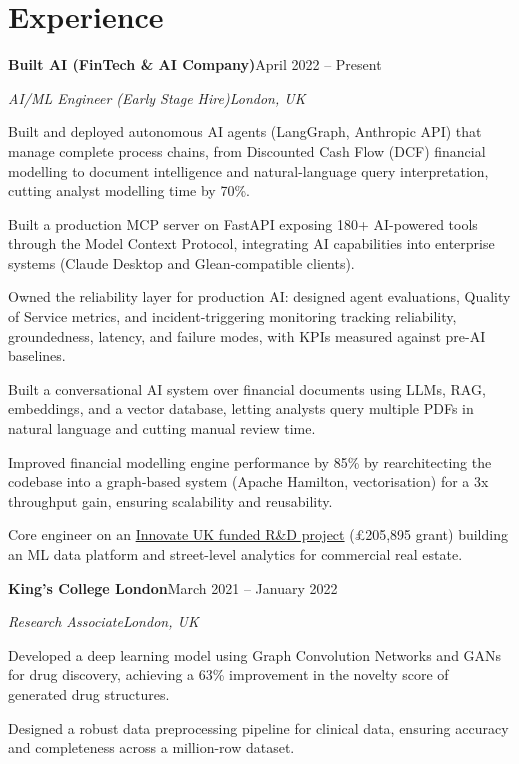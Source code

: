 \documentclass[10pt,a4paper]{article}
\newcommand{\entry}[4]{%
  {\color{company}\bfseries #1}\hfill {\color{muted}#2}\par
  \vspace{1pt}
  {\itshape #3}\hfill {\color{muted}\itshape #4}\par
  \vspace{3pt}%
}
\begin{document}
\section{Experience}
\entry{Built AI (FinTech \& AI Company)}{April 2022 -- Present}{AI/ML Engineer (Early Stage Hire)}{London, UK}
\begin{tight}
  \item Built and deployed autonomous AI agents (LangGraph, Anthropic API) that manage complete process chains, from Discounted Cash Flow (DCF) financial modelling to document intelligence and natural-language query interpretation, cutting analyst modelling time by 70\%.
  \item Built a production MCP server on FastAPI exposing 180+ AI-powered tools through the Model Context Protocol, integrating AI capabilities into enterprise systems (Claude Desktop and Glean-compatible clients).
  \item Owned the reliability layer for production AI: designed agent evaluations, Quality of Service metrics, and incident-triggering monitoring tracking reliability, groundedness, latency, and failure modes, with KPIs measured against pre-AI baselines.
  \item Built a conversational AI system over financial documents using LLMs, RAG, embeddings, and a vector database, letting analysts query multiple PDFs in natural language and cutting manual review time.
  \item Improved financial modelling engine performance by 85\% by rearchitecting the codebase into a graph-based system (Apache Hamilton, vectorisation) for a 3x throughput gain, ensuring scalability and reusability.
  \item Core engineer on an \href{https://gtr.ukri.org/projects?ref=10022996}{Innovate UK funded R\&D project} (\pounds205,895 grant) building an ML data platform and street-level analytics for commercial real estate.
\end{tight}

\entry{King's College London}{March 2021 -- January 2022}{Research Associate}{London, UK}
\begin{tight}
  \item Developed a deep learning model using Graph Convolution Networks and GANs for drug discovery, achieving a 63\% improvement in the novelty score of generated drug structures.
  \item Designed a robust data preprocessing pipeline for clinical data, ensuring accuracy and completeness across a million-row dataset.
\end{tight}
\end{document}
